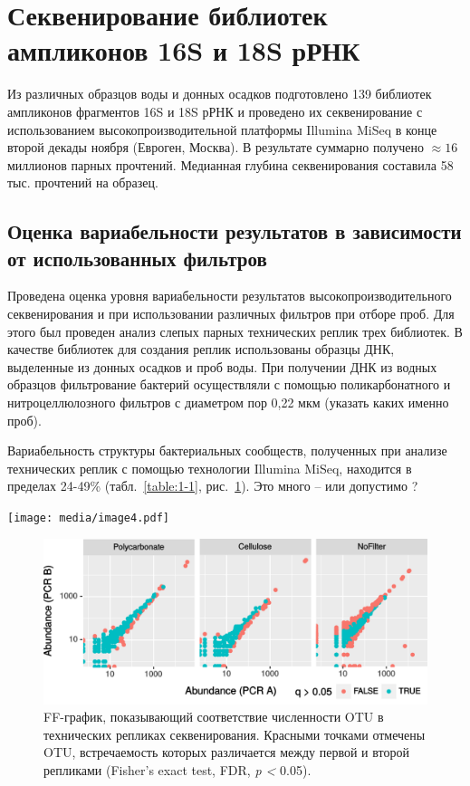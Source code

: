 \documentclass[a4paper,12pt,openany,final]{extreport}
\def\oldcaption{} \let\oldcaption=\caption
\def\caption{\stepcounter{captionsnum}\oldcaption}
\begin{document}
\section{Секвенирование библиотек ампликонов 16S и 18S рРНК }

Из различных образцов воды и донных осадков подготовлено 139 библиотек
ампликонов фрагментов 16S и 18S рРНК и проведено их секвенирование с
использованием высокопроизводительной платформы Illumina MiSeq в конце
второй декады ноября (Евроген, Москва). В результате суммарно получено
\(\approx{}\!\!16\) миллионов парных прочтений. Медианная глубина
секвенирования составила 58 тыс. прочтений на образец.

\subsection{Оценка вариабельности результатов в зависимости от
использованных фильтров}

Проведена оценка уровня вариабельности результатов
высокопроизводительного секвенирования и при использовании различных
фильтров при отборе проб. Для этого был проведен анализ слепых парных
технических реплик трех библиотек. В качестве библиотек для создания
реплик использованы образцы ДНК, выделенные из донных осадков и проб
воды. При получении ДНК из водных образцов фильтрование бактерий
осуществляли с помощью поликарбонатного и нитроцеллюлозного фильтров с
диаметром пор 0,22 мкм (указать каких именно проб).

Вариабельность структуры бактериальных сообществ, полученных при анализе
технических реплик с помощью технологии Illumina MiSeq, находится в
пределах 24-49\% (табл.~\ref{table:1-1}, рис.~\ref{fig:1-1}). Это много -- или допустимо ?

\begin{table}
\caption{Результаты фильтрации ошибочных OTU на основании
статистического анализа равномерности встречаемости OTU в технических
репликах секвенирования бактериальных сообществ. \textbf{По-русски, и указать,
  какие именно это пробы}}\label{table:1-1}
\vspace{1em}
\centering
\texttt{[image: media/image4.pdf]}
\end{table}

\begin{figure}[bhtp]\centering
\includegraphics[width=0.9\linewidth]{media/image5.png}

\caption{FF-график, показывающий соответствие численности OTU в технических
репликах секвенирования. Красными точками отмечены OTU, встречаемость
которых различается между первой и второй репликами (Fisher's exact
test, FDR, \emph{p \textless{}} 0.05).}\label{fig:1-1}
\end{figure}
\end{document}

